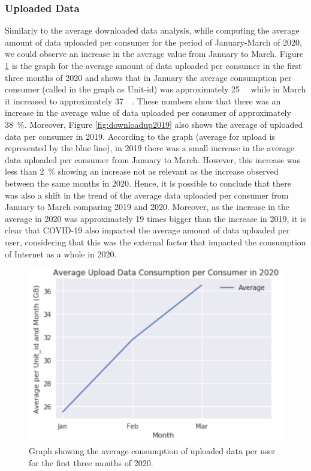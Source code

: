 \documentclass[conference,10pt]{IEEEtran}
\begin{document}
\subsubsection{Uploaded Data}
\label{sec:upload-data-consumption}

Similarly to the average downloaded data analysis, while computing the average amount of data uploaded per consumer for the period of January-March of 2020, we could observe an increase in the average value from January to March. Figure \ref{fig:upload2020} is the graph for the average amount of data uploaded per consumer in the first three months of 2020 and shows that in January the average consumption per consumer (called in the graph as Unit-id) was approximately \SI{25}{\giga\byte} while in March it increased to approximately \SI{37}{\giga\byte}. These numbers show that there was an increase in the average value of data uploaded per consumer of approximately \SI{38}{\percent}. Moreover, Figure \ref{fig:downloadup2019} also shows the average of uploaded data per consumer in 2019. According to the graph (average for upload is represented by the blue line), in 2019 there was a small increase in the average data uploaded per consumer from January to March. However, this increase was less than \SI{2}{\percent} showing an increase not as relevant as the increase observed between the same months in 2020. Hence, it is possible to conclude that there was also a shift in the trend of the average data uploaded per consumer from January to March comparing 2019 and 2020. Moreover, as the increase in the average in 2020 was approximately 19 times bigger than the increase in 2019, it is clear that COVID-19 also impacted the average amount of data uploaded per user, considering that this was the external factor that impacted the consumption of Internet as a whole in 2020.

\begin{figure}
\centering
\includegraphics[width=1.0\linewidth]{figs/upload2020.PNG}
\caption{Graph showing the average consumption of uploaded data per user for the first three months of 2020.}
\label{fig:upload2020}
\end{figure}
\end{document}
